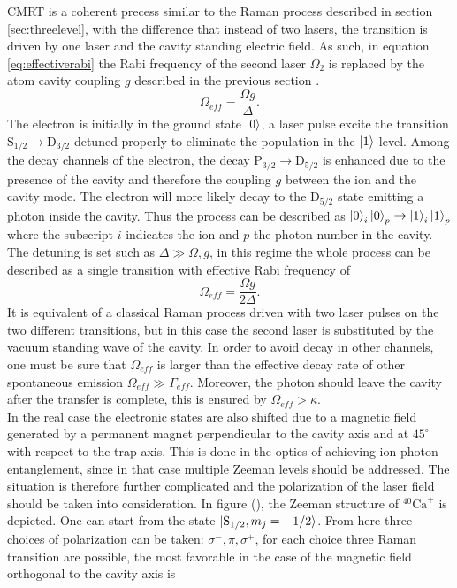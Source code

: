 CMRT is a coherent precess similar to the Raman process described in section \ref{sec:threelevel}, with the difference that instead of two lasers, the transition is driven by one laser and the cavity standing electric field. As such, in equation \eqref{eq:effectiverabi} the Rabi frequency of the second laser $\Omega_2$ is replaced by the atom cavity coupling $g$ described in the previous section \cite{Barros2009}.
\begin{equation}
\label{omegaeff}
\Omega_{eff} = \frac{\Omega g}{\Delta}.
\end{equation}
The electron is initially in the ground state $\ket{0}$, a laser pulse excite the transition $\text{S}_{1/2} \to \text{D}_{3/2}$ detuned properly to eliminate the population in the $\ket{1}$ level. Among the decay channels of the electron, the decay $\text{P}_{3/2} \to \text{D}_{5/2}$ is enhanced due to the presence of the cavity and therefore the coupling $g$ between the ion and the cavity mode. The electron will more likely decay
to the $\text{D}_{5/2}$ state emitting a photon inside the cavity. Thus the process can be described as $\ket{0}_i\ket{0}_p \to \ket{1}_i\ket{1}_p$ where the subscript $i$ indicates the ion and $p$ the photon number in the cavity. The detuning is set such as $\Delta \gg \Omega,g$, in this regime the whole process can be described as a single transition with effective Rabi frequency of \cite{helene}
\begin{equation}
\label{omegaeff}
\Omega_{eff} = \frac{\Omega g}{2\Delta}.
\end{equation}
It is equivalent of a classical Raman process driven with two laser pulses on the two different transitions, but in this case the second laser is substituted by the vacuum standing wave of the cavity. In order to avoid decay in other channels, one must be sure that $\Omega_{eff}$ is larger than the effective decay rate of other spontaneous emission $\Omega_{eff}\gg \Gamma_{eff}$. Moreover, the photon should leave the cavity after the transfer is complete, this is ensured by $\Omega_{eff} >\kappa$.\\
In the real case the electronic states are also shifted due to a magnetic field generated by a permanent magnet perpendicular to the cavity axis and at $45^{\circ}$ with respect to the trap axis. This is done in the optics of achieving ion-photon entanglement, since in that case multiple Zeeman levels should be addressed. The situation is therefore further complicated and the polarization of the laser field should be taken into consideration. In figure (), the Zeeman structure of $^{40}\text{Ca}^+$ is depicted. One can start from the state $\ket{\text{S}_{1/2},m_j = -1/2}$. From here three choices of polarization can be taken: $\sigma^-,\pi,\sigma^+$, for each choice three Raman transition are possible, the most favorable in the case of the magnetic field orthogonal to the cavity axis is \cite{stuteinterface}
